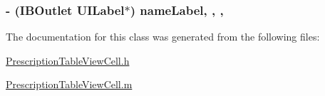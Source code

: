 \subsubsection[{name\+Label}]{\setlength{\rightskip}{0pt plus 5cm}-\/ (I\+B\+Outlet U\+I\+Label$\ast$) name\+Label\hspace{0.3cm}{\ttfamily [read]}, {\ttfamily [write]}, {\ttfamily [nonatomic]}, {\ttfamily [weak]}}\label{interface_prescription_table_view_cell_a31cf8f092908312c5043e380af795446}


The documentation for this class was generated from the following files\+:\begin{DoxyCompactItemize}
\item 
\hyperlink{_prescription_table_view_cell_8h}{Prescription\+Table\+View\+Cell.\+h}\item 
\hyperlink{_prescription_table_view_cell_8m}{Prescription\+Table\+View\+Cell.\+m}\end{DoxyCompactItemize}
